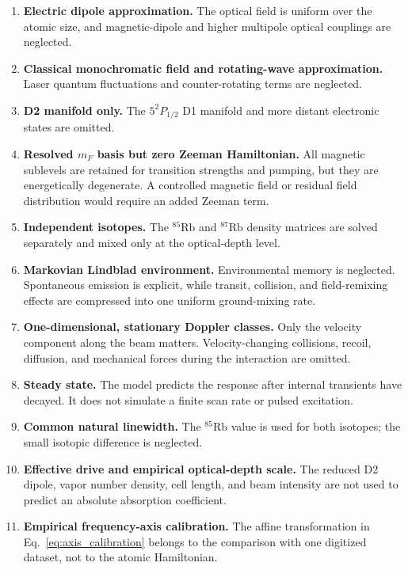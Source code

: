 \begin{enumerate}[label=\arabic*.]
\item \textbf{Electric dipole approximation.}
The optical field is uniform over the atomic size, and magnetic-dipole and
higher multipole optical couplings are neglected.

\item \textbf{Classical monochromatic field and rotating-wave approximation.}
Laser quantum fluctuations and counter-rotating terms are neglected.

\item \textbf{D2 manifold only.}
The \(5^2P_{1/2}\) D1 manifold and more distant electronic states are omitted.

\item \textbf{Resolved \(m_F\) basis but zero Zeeman Hamiltonian.}
All magnetic sublevels are retained for transition strengths and pumping, but
they are energetically degenerate.  A controlled magnetic field or residual
field distribution would require an added Zeeman term.

\item \textbf{Independent isotopes.}
The \(^{85}\mathrm{Rb}\) and \(^{87}\mathrm{Rb}\) density matrices are solved
separately and mixed only at the optical-depth level.

\item \textbf{Markovian Lindblad environment.}
Environmental memory is neglected.  Spontaneous emission is explicit, while
transit, collision, and field-remixing effects are compressed into one
uniform ground-mixing rate.

\item \textbf{One-dimensional, stationary Doppler classes.}
Only the velocity component along the beam matters.  Velocity-changing
collisions, recoil, diffusion, and mechanical forces during the interaction
are omitted.

\item \textbf{Steady state.}
The model predicts the response after internal transients have decayed.  It
does not simulate a finite scan rate or pulsed excitation.

\item \textbf{Common natural linewidth.}
The \(^{85}\mathrm{Rb}\) value is used for both isotopes; the small isotopic
difference is neglected.

\item \textbf{Effective drive and empirical optical-depth scale.}
The reduced D2 dipole, vapor number density, cell length, and beam intensity
are not used to predict an absolute absorption coefficient.

\item \textbf{Empirical frequency-axis calibration.}
The affine transformation in Eq.~\eqref{eq:axis_calibration} belongs to the
comparison with one digitized dataset, not to the atomic Hamiltonian.
\end{enumerate}

